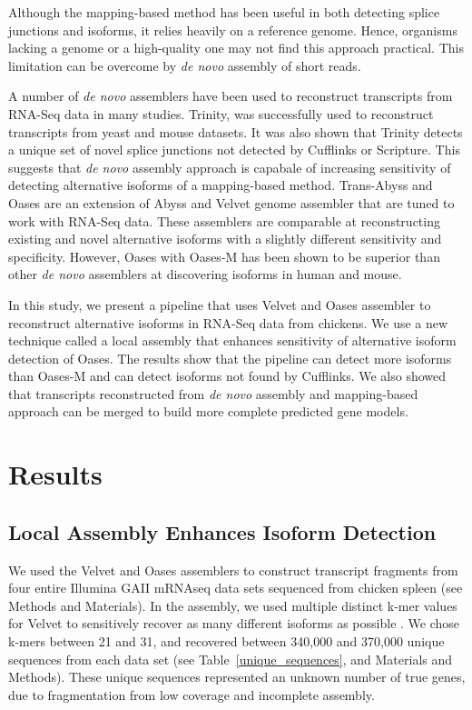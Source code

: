 \documentclass[10pt]{article}
\begin{document}
Although the mapping-based method has been useful in both detecting splice junctions and isoforms,
it relies heavily on a reference genome.
Hence, organisms lacking a genome or a high-quality one may not find this approach practical.
This limitation can be overcome by \emph{de novo} assembly of short reads.

A number of \emph{de novo} assemblers have been used to reconstruct transcripts from RNA-Seq data in
many studies.
Trinity\cite{Grabherr:2011jb}, was successfully used to reconstruct transcripts from yeast and mouse datasets.
It was also shown that Trinity detects a unique set of novel splice junctions not detected by Cufflinks
or Scripture.
This suggests that \emph{de novo} assembly approach is capabale of increasing sensitivity of detecting
alternative isoforms of a mapping-based method.
Trans-Abyss\cite{Robertson:2010ih} and Oases\cite{Schulz:2012je} are an extension
of Abyss\cite{Simpson:2009iv} and Velvet\cite{Zerbino:2008vu,Zerbino:2009jp} genome assembler
that are tuned to work with RNA-Seq data.
These assemblers are comparable at reconstructing existing and novel alternative isoforms with a slightly
different sensitivity and specificity.
However, Oases with Oases-M has been shown to be superior than other \emph{de novo}
assemblers at discovering isoforms in human and mouse\cite{Schulz:2012je}.

In this study, we present a pipeline that uses Velvet and Oases assembler to
reconstruct alternative isoforms in RNA-Seq data from chickens.
We use a new technique called a local assembly that enhances sensitivity of
alternative isoform detection of Oases.
The results show that the pipeline can detect more isoforms than Oases-M and
can detect isoforms not found by Cufflinks.
We also showed that transcripts reconstructed from \emph{de novo} assembly and mapping-based approach can be
merged to build more complete predicted gene models.

\section*{Results}

\subsection*{Local Assembly Enhances Isoform Detection}

We used the Velvet\cite{Zerbino:2008vu} and Oases\cite{Schulz:2012je}
assemblers to construct transcript fragments from four entire Illumina
GAII mRNAseq data sets sequenced from chicken spleen (see Methods and
Materials).  In the assembly, we used multiple distinct k-mer values
for Velvet to sensitively recover as many different isoforms as possible
\cite{Schulz:2012je}.  We chose k-mers between 21 and 31,
and recovered between 340,000 and 370,000 unique sequences from
each data set (see Table~\ref{unique_sequences}, and Materials and
Methods).  These unique sequences represented an unknown number of
true genes, due to fragmentation from low coverage and incomplete
assembly.
\end{document}
